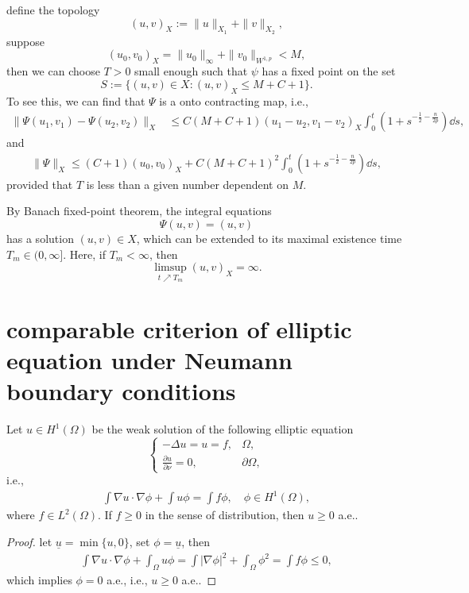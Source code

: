 define the topology
\[
	(u,v)_X := \|u\|_{X_1} + \|v\|_{X_2},
\]
suppose
\[
	(u_0,v_0)_X = \|u_0\|_\infty + \|v_0\|_{W^{1,p}} < M,
\]
then we can choose $T>0$ small enough such that 
$\psi$ has a fixed point on the set 
\[
	S := \{ (u,v)\in X: (u,v)_X \leq M + C + 1\}.
\]
To see this, we can find that 
$\Psi$ is a onto contracting map, i.e.,
\begin{align*}
	\|\Psi(u_1,v_1) - \Psi(u_2,v_2)\|_X 
	&\leq C(M+C+1)(u_1-u_2,v_1-v_2)_X\int_0^t\left(1+s^{-\frac{1}{2}-\frac{n}{2p}}\right)\dd s,
\end{align*}
and 
\begin{align*}
	\|\Psi\|_X \leq (C+1)(u_0,v_0)_X + C(M+C+1)^2\int_0^t\left(1+s^{-\frac{1}{2}-\frac{n}{2p}}\right)\dd s,
\end{align*}
provided that $T$ is less than a given number dependent on $M$.

By Banach fixed-point theorem, the integral equations
\[
	\Psi(u,v) = (u,v)
\]
has a solution $(u,v)\in X$, which can be extended to its maximal existence time $T_m\in(0,\infty]$.
Here, if $T_m < \infty$, then
\[
	\limsup_{t\nearrow T_m} (u,v)_X = \infty.
\]

\section{comparable criterion of elliptic equation under Neumann boundary conditions}

\begin{lemma}
	Let $u\in H^1(\Omega)$ be the weak solution of the following elliptic equation
	\begin{equation*}
		\begin{cases}
			-\Delta u = u = f, & \Omega,\\
			\frac{\partial u}{\partial \nu} = 0, & \partial\Omega,
		\end{cases}
	\end{equation*} 
	i.e.,
	\begin{align*}
		\int \nabla u\cdot\nabla \phi + \int u\phi = \int f\phi,\quad \phi\in H^1(\Omega),
	\end{align*}
	where $f\in L^2(\Omega)$.
	If $f\geq0$ in the sense of distribution,
	then $u\geq0$ a.e..
\end{lemma}
\begin{proof}
	let $\underline{u} = \min\{u,0\}$, 
	set $\phi = \underline{u}$, 
	then
	\begin{align*}
		\int \nabla u\cdot\nabla\phi + \int_\Omega u\phi 
		= \int|\nabla\phi|^2 + \int_\Omega\phi^2 
		= \int f\phi \leq 0, 
	\end{align*}
	which implies $\phi = 0$ a.e., i.e., $u\geq0$ a.e..
\end{proof}

